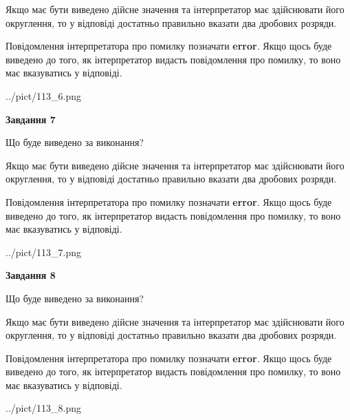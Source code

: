 \documentclass[12pt, ukrainian]{article}
\begin{document}
{\begin {Large}
Якщо має бути виведено дійсне значення та інтерпретатор має здійснювати його округлення, 
то у відповіді достатньо правильно вказати два дробових розряди.

Повідомлення інтерпретатора про помилку позначати \textbf{error}.
Якщо щось буде виведено до того, як інтерпретатор видасть повідомлення про помилку, 
то воно має вказуватись у відповіді. \par

\begin{center}
	{../pict/113_6.png}
\end{center}
\newpage

{\begin {center}\textbf{Завдання 7}\end {center}}\par
Що буде виведено за виконання? \par

Якщо має бути виведено дійсне значення та інтерпретатор має здійснювати його округлення, 
то у відповіді достатньо правильно вказати два дробових розряди.

Повідомлення інтерпретатора про помилку позначати \textbf{error}.
Якщо щось буде виведено до того, як інтерпретатор видасть повідомлення про помилку, 
то воно має вказуватись у відповіді. \par

\begin{center}
	{../pict/113_7.png}
\end{center}
\newpage

{\begin {center}\textbf{Завдання 8}\end {center}}\par
Що буде виведено за виконання? \par

Якщо має бути виведено дійсне значення та інтерпретатор має здійснювати його округлення, 
то у відповіді достатньо правильно вказати два дробових розряди.

Повідомлення інтерпретатора про помилку позначати \textbf{error}.
Якщо щось буде виведено до того, як інтерпретатор видасть повідомлення про помилку, 
то воно має вказуватись у відповіді. \par

\begin{center}
	{../pict/113_8.png}
\end{center}
\newpage


\end{Large}}
\end{document}

